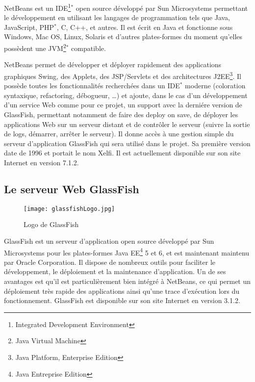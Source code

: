 NetBeans est un IDE\protect\footnote{Integrated Development Environment}$^*$ open source d\'evelopp\'e par Sun Microsystems permettant le d\'eveloppement en utilisant les langages de programmation tels que Java, JavaScript, PHP$^*$, C, C++, et autres.
Il est \'ecrit en Java et fonctionne sous Windows, Mac OS, Linux, Solaris et d'autres plates-formes du moment qu'elles poss\`edent une JVM\protect\footnote{Java Virtual Machine}$^*$ compatible.

NetBeans permet de d\'evelopper et d\'eployer rapidement des applications graphiques Swing, des Applets, des JSP/Servlets et des architectures J2EE\protect\footnote{Java Platform, Enterprise Edition}.
Il poss\`ede toutes les fonctionnalit\'es recherch\'ees dans un IDE$^*$ moderne (coloration syntaxique, refactoring, d\'ebogueur, \ldots) et ajoute, dans le cas d'un d\'eveloppement d'un service Web comme pour ce projet, un support avec la derni\'ere version de GlassFish, permettant notamment de faire des \og{}deploy on save\fg{}, de d\'eployer les applications Web sur un serveur distant et de contr\^oler le serveur (suivre la sortie de logs, d\'emarrer, arr\^eter le serveur). Il donne acc\`es \`a une gestion simple du serveur d'application GlassFish qui sera utilis\'e dans le projet.
Sa premi\`ere version date de 1996 et portait le nom Xelfi. Il est actuellement disponible sur son site Internet\cite{biblio:siteNetbeans} en version 7.1.2.


\subsection{Le serveur Web GlassFish}

\begin{figure}[!ht]
	\centering
	\texttt{[image: glassfishLogo.jpg]}
	\caption{Logo de GlassFish}

\end{figure}

GlassFish est un serveur d'application open source d\'evelopp\'e par Sun Microsystems pour les plates-formes Java EE\protect\footnote{Java Entreprise Edition} 5 et 6, et est maintenant maintenu par Oracle Corporation.
Il dispose de nombreux outils pour faciliter le d\'eveloppement, le d\'eploiement et la maintenance d'application.
Un de ses avantages est qu'il est particuli\`erement bien int\'egr\'e \`a NetBeans, ce qui permet un d\'eploiement tr\`es rapide des applications ainsi qu'une trace d'ex\'ecution lors du fonctionnement.
GlassFish est disponible sur son site Internet\cite{biblio:siteGlassfish} en version 3.1.2.

